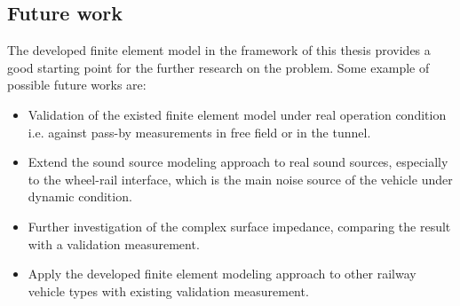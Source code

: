 \subsection*{Future work}
The developed finite element model in the framework of this thesis provides a good starting point for the further research on the problem. Some example of possible future works are:

\begin{itemize}
	\item Validation of the existed finite element model under real operation condition i.e. against pass-by measurements in free field or in the tunnel.
	\item Extend the sound source modeling approach to real sound sources, especially to the wheel-rail interface, which is the main noise source of the vehicle under dynamic condition.
	\item Further investigation of the complex surface impedance, comparing the result with a validation measurement.
	\item Apply the developed finite element modeling approach to other railway vehicle types with existing validation measurement.
\end{itemize}